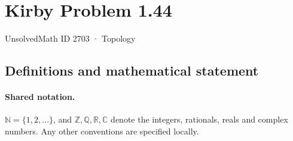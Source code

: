 \documentclass[11pt]{article}
\begin{document}
\setcounter{section}{2702}
\section{Kirby Problem 1.44}\label{2703}
{\small\sffamily UnsolvedMath ID 2703 · Topology}
\subsection{Definitions and mathematical statement}

\paragraph{Shared notation.}$\mathbb N=\{1,2,\ldots\}$, and $\mathbb Z,\mathbb Q,\mathbb R,\mathbb C$ denote the integers, rationals, reals and complex numbers. Any other conventions are specified locally.
\end{document}
